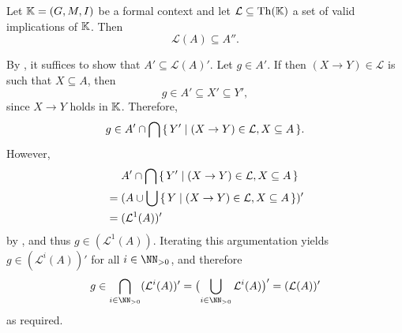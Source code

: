 \begin{Proposition}
  \label{prop:sound-implications-do-not-yield-more-then-doubleprime}
  Let ${\mathbb{K}} = (G, M, I)$ be a formal context and let $\mathcal{L} \subseteq \operatorname{Th}({\mathbb{K}})$
  a set of valid implications of ${\mathbb{K}}$.  Then
  \begin{equation*}
    \mathcal{L}(A) \subseteq A''.
  \end{equation*}
\end{Proposition}
\begin{Proof}
  By , it suffices to show that $A' \subseteq
  \mathcal{L}(A)'$.  Let $g \in A'$.  If then $(X \to Y) \in \mathcal{L}$ is such that $X
  \subseteq A$, then
  \begin{equation*}
    g \in A' \subseteq X' \subseteq Y',
  \end{equation*}
  since $X \to Y$ holds in ${\mathbb{K}}$.  Therefore,
  \begin{equation*}
    g \in A' \cap \bigcap {\ensuremath{\{\, Y' \mid (X \to Y) \in \mathcal{L}, X \subseteq A \,\}}}.
  \end{equation*}
  However,
  \begin{align*}
    & \phantom{{}={}} A' \cap \bigcap \set{ Y' \mid (X \to Y) \in \mathcal{L}, X \subseteq A} \\
    & = (A \cup \bigcup \set{ Y \mid (X \to Y) \in \mathcal{L}, X \subseteq A })'\\
    & = (\mathcal{L}^1(A))'
  \end{align*}
  by , and thus $g \in (\mathcal{L}^1(A))$.  Iterating
  this argumentation yields $g \in (\mathcal{L}^i(A))'$ for all $i \in \NN_{>0}$, and
  therefore
  \begin{equation*}
    g \in \bigcap_{i \in \NN_{>0}} (\mathcal{L}^i(A))' = \bigl( \bigcup_{i \in \NN_{>0}}
    \mathcal{L}^i(A) \bigr)' = (\mathcal{L}(A))'
  \end{equation*}
  as required.
\end{Proof}

